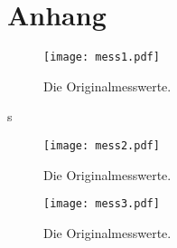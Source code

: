 \section*{Anhang}

\begin{figure}
  \centering
  \texttt{[image: mess1.pdf]}
  \caption{Die Originalmesswerte.}
  \label{fig:mess1}
\end{figure}s
\begin{figure}
  \centering
  \texttt{[image: mess2.pdf]}
  \caption{Die Originalmesswerte.}
  \label{fig:mess2}
\end{figure}
\begin{figure}
  \centering
  \texttt{[image: mess3.pdf]}
  \caption{Die Originalmesswerte.}
  \label{fig:mess3}
\end{figure}